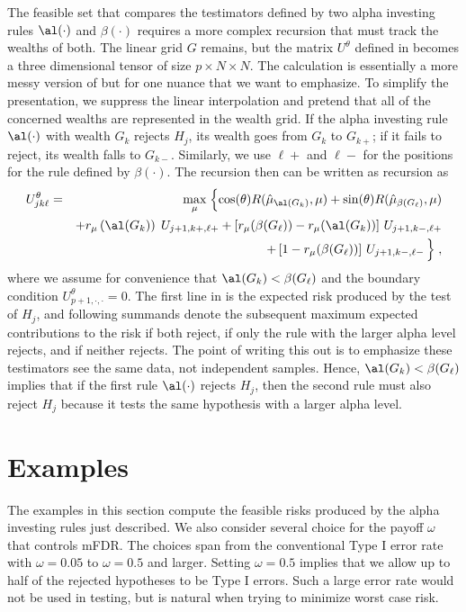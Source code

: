 \documentclass[12pt]{article}
\begin{document}
 The feasible set that compares the testimators defined by two alpha investing
 rules $\al(\cdot)$ and $\beta(\cdot)$ requires a more complex recursion that
 must track the wealths of both.  The linear grid $G$ remains, but the matrix
 $U^\theta$ defined in  becomes a three dimensional tensor of size
 $p \times N \times N$.  The calculation is essentially a more messy version of
  but for one nuance that we want to emphasize.  To simplify the
 presentation, we suppress the linear interpolation and pretend that all of the
 concerned wealths are represented in the wealth grid.  If the alpha investing
 rule $\al(\cdot)$ with wealth $G_k$ rejects $H_j$, its wealth goes from $G_k$
 to $G_{k+}$; if it fails to reject, its wealth falls to $G_{k-}$.
  Similarly, we use $\ell+$ and $\ell-$ for the positions for the rule defined
 by $\beta(\cdot)$.  The recursion then can be written as recursion as
 \begin{eqnarray}
   U^\theta_{jk\ell} &=&  \max_\mu \;\Bigl\{
     \cos(\theta) R(\hat\mu_{\al(G_k)}, \mu) 
       + \sin(\theta) R(\hat\mu_{\beta(G_\ell)},\mu) \cr
     & & + r_\mu\left(\al(G_k)\right) \; U_{j+1,k+,\ell+} 
         + \left[ r_\mu(\beta(G_\ell)) - r_\mu(\al(G_k)) \right] \, U_{j+1,k-,\ell+} \cr
     & & + \left[1-r_\mu(\beta(G_\ell))\right] \, U_{j+1,k-,\ell-} \, \Bigr\}\;,
 \label{eq:Ujkl}
 \end{eqnarray}
 where we assume for convenience that $\al(G_k) < \beta(G_\ell)$ and the
 boundary condition $U_{p+1,\cdot,\cdot}^\theta= 0$.  The first line in
  is the expected risk produced by the test of $H_j$, and following
 summands denote the subsequent maximum expected contributions to the risk if
 both reject, if only the rule with the larger alpha level rejects, and if
 neither rejects.  The point of writing this out is to emphasize these
 testimators see the same data, not independent samples.  Hence, $\al(G_k) <
 \beta(G_\ell)$ implies that if the first rule $\al(\cdot)$ rejects $H_j$, then
 the second rule must also reject $H_j$ because it tests the same hypothesis
 with a larger alpha level.  


\section{ Examples }
 
 The examples in this section compute the feasible risks produced by the alpha
 investing rules just described.  We also consider several choice for the payoff
 $\omega$ that controls mFDR.  The choices span from the conventional Type I
 error rate with $\omega=0.05$ to $\omega = 0.5$ and larger.  Setting
 $\omega=0.5$ implies that we allow up to half of the rejected hypotheses to be
 Type I errors.  Such a large error rate would not be used in testing, but is
 natural when trying to minimize worst case risk.  
\end{document}
